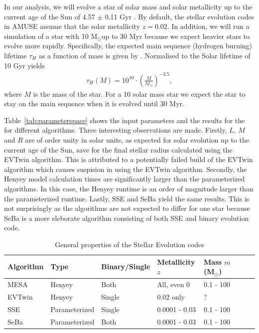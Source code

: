 \documentclass{aa}
\newcommand{\Sun}[0]{\ensuremath{_{\odot}}}
\begin{document}
In our analysis, we will evolve a star of solar mass and solar metallicity up to the current age of the Sun of 4.57 $\pm$ 0.11 Gyr \citep{2002A&A...390.1115B}. By default, the stellar evolution codes in AMUSE assume that the solar metallicity $z = 0.02$.
In addition, we will run a simulation of a star with 10 M\Sun up to 30 Myr because we expect heavier stars to evolve more rapidly. Specifically, the expected main sequence (hydrogen burning) lifetime $\tau_H$ as a function of mass is given by \citep[][p. 347]{2012sse..book.....K}. Normalised to the Solar lifetime of 10 Gyr \citep{1993ApJ...418..457S} yields
\begin{eqnarray}
     \tau_H(M) = 10^{10} \cdot \left(\frac{M}{M\Sun}\right)^{-2.5},
\end{eqnarray} where $M$ is the mass of the star. For a 10 solar mass star we expect the star to stay on the main sequence when it is evolved until 30 Myr.

Table~\ref{tab:parameterspace} shows the input parameters and the results for the for different algorithms. Three interesting observations are made. Firstly, $L$, $M$ and $R$ are of order unity in solar units, as expected for solar evolution up to the current age of the Sun, save for the final stellar radius calculated using the EVTwin algorithm. This is attributed to a potentially failed build of the EVTwin algorithm which causes suspision in using the EVTwin algorithm. Secondly, the Henyey model calculation times are significantly larger than the parameterized algorithms. In this case, the Henyey runtime is an order of magnitude larger than the parameterized runtime. Lastly, SSE and SeBa yield the same results. This is not surprisingly as the algorithms are not expected to differ for one star because SeBa is a more eleborate algorithm consisting of both SSE and binary evolution code.

\begin{table}
    \caption{General properties of the Stellar Evolution codes \citep{AMUSEdocumentation}}
    \label{tab:algorithms}
    \centering
    \begin{tabular}{l l l l l l l l }
        \hline\hline
        Algorithm & Type & Binary/Single & Metallicity $z$ & Mass $m$ (M\Sun) \\
        \hline
        MESA & Henyey & Both & All, even 0 & 0.1 - 100 \\
        EVTwin & Henyey & Single\footnotemark[1] & 0.02 only & ? \\
        SSE & Parameterized & Single & 0.0001 - 0.03 & 0.1 - 100 \\
        SeBa & Parameterized & Both & 0.0001 - 0.03 & 0.1 - 100 \\
        \hline
    \end{tabular}
\end{table}
\addtocounter{footnote}{1}
\footnotetext[\value{footnote}]{Binaries are not yet available in AMUSE EVTwin Interface.}
\end{document}
